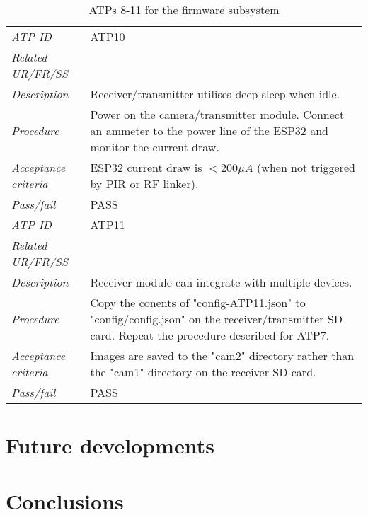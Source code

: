 \documentclass[class=report,11pt,crop=false]{standalone}
\begin{document}
\begin{table}[!ht]
\begin{scriptsize}
\begin{tabularx}{\textwidth}{|p{} X|}
        \textit{ATP ID} & ATP10\\
        \textit{Related UR/FR/SS} & \\
        \textit{Description} & Receiver/transmitter utilises deep sleep when idle.\\
        \textit{Procedure} & Power on the camera/transmitter module. Connect an ammeter to the power line of the ESP32 and monitor the current draw. \\
        \textit{Acceptance criteria} & ESP32 current draw is $ < 200 \mu A $ (when not triggered by PIR or RF linker).\\ 
        \textit{Pass/fail} & PASS\\ \hline

        \textit{ATP ID} & ATP11\\
        \textit{Related UR/FR/SS} & \\
        \textit{Description} & Receiver module can integrate with multiple devices.\\
        \textit{Procedure} & Copy the conents of "config-ATP11.json" to "config/config.json" on the receiver/transmitter SD card. Repeat the procedure described for ATP7. \\
        \textit{Acceptance criteria} & Images are saved to the "cam2" directory rather than the "cam1" directory on the receiver SD card.\\ 
        \textit{Pass/fail} & PASS\\ \hline
        

    \end{tabularx}
    \end{scriptsize}
    \caption{ATPs 8-11 for the firmware subsystem}
    \label{tab:firmware-atps2}
\end{table}

\section{Future developments}


\section{Conclusions}



\ifstandalone

\printnoidxglossary[type=\acronymtype,nonumberlist]
\fi
\end{document}
